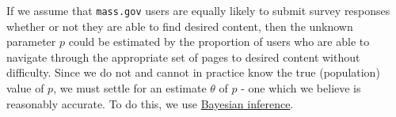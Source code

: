 If we assume that \texttt{mass.gov} users are equally likely to submit survey responses whether or not they are able to find desired content, then the unknown parameter $p$ could be estimated by the proportion of users who are able to navigate through the appropriate set of pages to desired content without difficulty. Since we do not and cannot in practice know the true (population) value of $p$, we must settle for an estimate $\theta$ of $p$ - one which we believe is reasonably accurate. To do this, we use \href{https://en.wikipedia.org/wiki/Bayesian_inference}{Bayesian inference}.